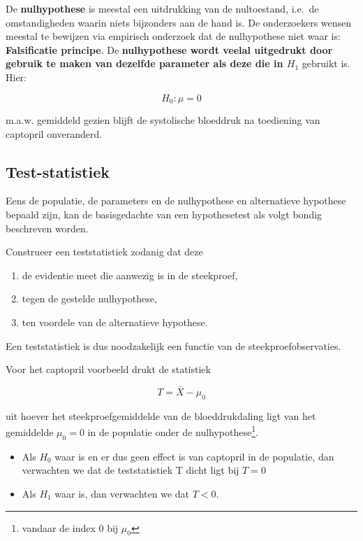 \documentclass[
  12pt,dutch]{book}
\providecommand{\tightlist}{%
  \setlength{\itemsep}{0pt}\setlength{\parskip}{0pt}}
\theoremstyle{definition}
\theoremstyle{definition}
\theoremstyle{definition}
\theoremstyle{definition}
\theoremstyle{remark}
\begin{document}
De \textbf{nulhypothese} is meestal een uitdrukking van de nultoestand, i.e.~de omstandigheden waarin niets bijzonders aan de hand is.
De onderzoekers wensen meestal te bewijzen via empirisch onderzoek dat de nulhypothese niet waar is:
\textbf{Falsificatie principe}.
De \textbf{nulhypothese wordt veelal uitgedrukt door gebruik te maken van dezelfde parameter als deze die in \(H_1\)} gebruikt is. Hier:

\[H_0 : \mu=0\]

m.a.w. gemiddeld gezien blijft de systolische bloeddruk na toediening van captopril onveranderd.

\subsection{Test-statistiek}\label{test-statistiek}

Eens de populatie, de parameters en de nulhypothese en alternatieve hypothese bepaald zijn, kan de basisgedachte van een hypothesetest als volgt bondig beschreven worden.

Construeer een teststatistiek zodanig dat deze

\begin{enumerate}
\def\labelenumi{\arabic{enumi}.}
\tightlist
\item
  de evidentie meet die aanwezig is in de steekproef,
\item
  tegen de gestelde nulhypothese,
\item
  ten voordele van de alternatieve hypothese.
\end{enumerate}

Een teststatistiek is dus noodzakelijk een functie van de steekproefobservaties.

Voor het captopril voorbeeld drukt de statistiek

\[T=\bar X - \mu_0\]

uit hoever het steekproefgemiddelde van de bloeddrukdaling ligt van het gemiddelde \(\mu_0=0\) in de populatie onder de nulhypothese\footnote{vandaar de index 0 bij \(\mu_0\)}.

\begin{itemize}
\tightlist
\item
  Als \(H_0\) waar is en er dus geen effect is van captopril in de populatie, dan verwachten we dat de teststatistiek T dicht ligt bij \(T=0\)
\item
  Als \(H_1\) waar is, dan verwachten we dat \(T<0\).
\end{itemize}
\end{document}
